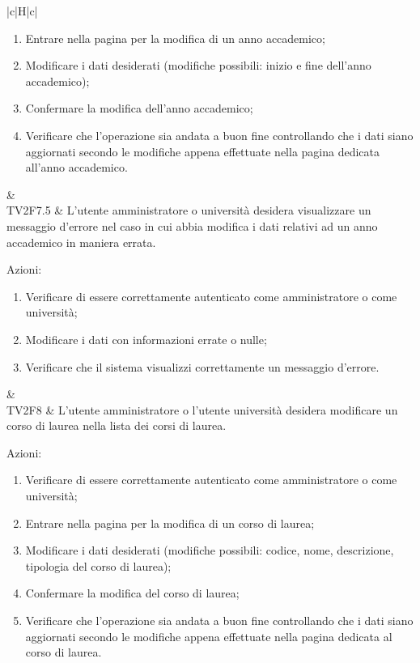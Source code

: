 \begin{longtable}{|c|H|c|}
\begin{enumerate}
		\item Entrare nella pagina per la modifica di un anno accademico;
		\item Modificare i dati desiderati (modifiche possibili: inizio e fine dell'anno accademico);
		\item Confermare la modifica dell'anno accademico;
		\item Verificare che l'operazione sia andata a buon fine controllando che i dati siano aggiornati secondo le modifiche appena effettuate nella pagina dedicata all'anno accademico.
	\end{enumerate} & \Tni \\ 
	\hline
	TV2F7.5 & L'utente amministratore o università desidera visualizzare un messaggio d'errore nel caso in cui abbia modifica i dati relativi ad un anno accademico in maniera errata. \newline \begin{flushleft}
		Azioni:\newline
	\end{flushleft} 
	\begin{enumerate}
		\item Verificare di essere correttamente autenticato come amministratore o come università;
		\item Modificare i dati con informazioni errate o nulle;
		\item Verificare che il sistema visualizzi correttamente un messaggio d'errore.
	\end{enumerate} & \Tni \\
	\hline
	TV2F8 & L'utente amministratore o l'utente università desidera modificare un corso di laurea nella lista dei corsi di laurea. \newline \begin{flushleft}
		Azioni:\newline
	\end{flushleft} 
		\begin{enumerate}
			\item Verificare di essere correttamente autenticato come amministratore o come università;
			\item Entrare nella pagina per la modifica di un corso di laurea;
			\item Modificare i dati desiderati (modifiche possibili: codice, nome, descrizione, tipologia del corso di laurea);
			\item Confermare la modifica del corso di laurea;
			\item Verificare che l'operazione sia andata a buon fine controllando che i dati siano aggiornati secondo le modifiche appena effettuate nella pagina dedicata al corso di laurea.

\end{enumerate}
\end{longtable}
